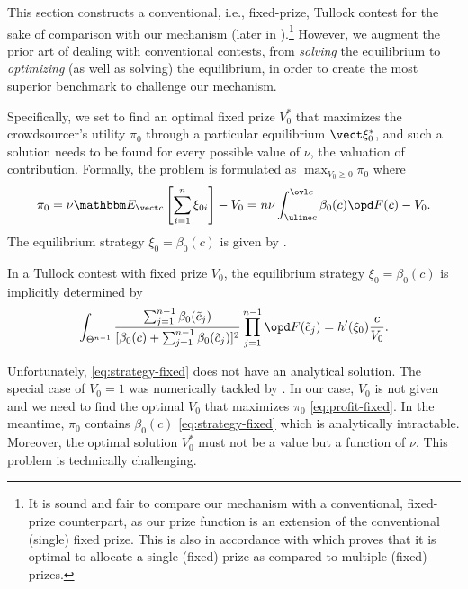 \documentclass{sig-alternate-10pt}
\begin{document}
This section constructs a conventional, i.e., fixed-prize, Tullock contest for the sake of comparison with our mechanism (later in ).\footnote{It is sound and fair to compare our mechanism with a conventional, fixed-prize counterpart, as our prize function is an extension of the conventional (single) fixed prize. This is also in accordance with \cite{optSymTullock12} which proves that it is optimal to allocate a single (fixed) prize as compared to multiple (fixed) prizes.} However, we augment the prior art of dealing with conventional contests\cite{Fey08,Ryvkin10,Wasser13}, from {\em solving} the equilibrium to {\em optimizing} (as well as solving) the equilibrium, in order to create the most superior benchmark to challenge our mechanism. 

Specifically, we set to find an optimal fixed prize $V_0^*$ that maximizes the crowdsourcer's utility $\pi_0$ through a particular equilibrium $\vect\xi_0^*$, and such a solution needs to be found for every possible value of $\nu$, the valuation of contribution. Formally, the problem is formulated as $\max_{V_0\ge 0} \pi_0$ where
\begin{align}\label{eq:profit-fixed}
\pi_0 = \nu \mathbbm E_{\vect c} \left[ \sum_{i=1}^n \xi_{0 i} \right] - V_0
= n\nu \int_{\uline c}^{\ovl c} \beta_0(c) \opd F(c) - V_0. 
\end{align}
The equilibrium strategy $\xi_0=\beta_0(c)$ is given by .
\begin{prop}\label{thm:strategy-fix}
In a Tullock contest with fixed prize $V_0$, the equilibrium strategy $\xi_0=\beta_0(c)$ is implicitly determined by
\begin{align}\label{eq:strategy-fixed}
\int_{\Theta^{n-1}} \frac{\sum_{j=1}^{n-1} \beta_0(\tilde c_j)}
	{[\beta_0(c) + \sum_{j=1}^{n-1} \beta_0(\tilde c_j)]^2 } \prod_{j=1}^{n-1} \opd F(\tilde c_j)
= h'(\xi_0) \frac{c}{V_0}.
\end{align}
\end{prop}

Unfortunately, \eqref{eq:strategy-fixed} does not have an analytical solution. The special case of $V_0=1$ was numerically tackled by \cite{Fey08,Ryvkin10,Wasser13}. In our case, $V_0$ is not given and we need to find the optimal $V_0$ that maximizes $\pi_0$ \eqref{eq:profit-fixed}. In the meantime, $\pi_0$ contains $\beta_0(c)$ \eqref{eq:strategy-fixed} which is analytically intractable. Moreover, the optimal solution $V_0^*$ must not be a value but a function of $\nu$. This problem is technically challenging.
\end{document}
